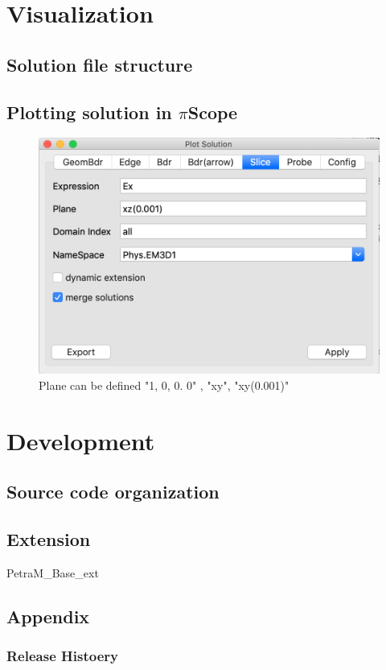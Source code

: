 \documentclass[11pt,a4paper,final]{report}
\begin{document}
\chapter{Visualization}
\section{Solution file structure}
\section{Plotting solution in $\pi$Scope}

\begin{figure}
\centering
\includegraphics[width=0.95\columnwidth]{figures/slice_plot.png} 
\caption{ Plane can be defined "1, 0, 0. 0" , "xy", "xy(0.001)" }\label{parametric_scan}
\end{figure}


\chapter{Development}
\section{Source code organization}
\section{Extension}
PetraM\_Base\_ext

\section{Appendix}
\subsection{Release Histoery}
\end{document}
